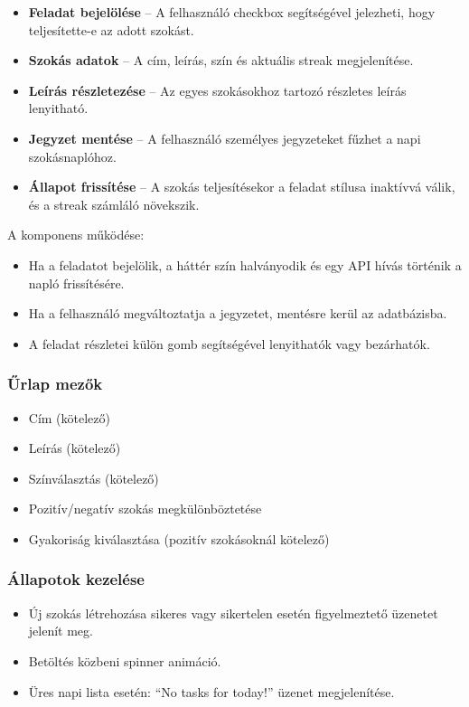 \documentclass[12pt]{report}
\begin{document}
\begin{itemize}
  \item \textbf{Feladat bejelölése} -- A felhasználó checkbox segítségével jelezheti, hogy teljesítette-e az adott szokást.
  \item \textbf{Szokás adatok} -- A cím, leírás, szín és aktuális streak megjelenítése.
  \item \textbf{Leírás részletezése} -- Az egyes szokásokhoz tartozó részletes leírás lenyitható.
  \item \textbf{Jegyzet mentése} -- A felhasználó személyes jegyzeteket fűzhet a napi szokásnaplóhoz.
  \item \textbf{Állapot frissítése} -- A szokás teljesítésekor a feladat stílusa inaktívvá válik, és a streak számláló növekszik.
\end{itemize}

A komponens működése:
\begin{itemize}
  \item Ha a feladatot bejelölik, a háttér szín halványodik és egy API hívás történik a napló frissítésére.
  \item Ha a felhasználó megváltoztatja a jegyzetet, mentésre kerül az adatbázisba.
  \item A feladat részletei külön gomb segítségével lenyithatók vagy bezárhatók.
\end{itemize}

\subsubsection{Űrlap mezők}

\begin{itemize}
  \item Cím (kötelező)
  \item Leírás (kötelező)
  \item Színválasztás (kötelező)
  \item Pozitív/negatív szokás megkülönböztetése
  \item Gyakoriság kiválasztása (pozitív szokásoknál kötelező)
\end{itemize}

\subsubsection{Állapotok kezelése}

\begin{itemize}
  \item Új szokás létrehozása sikeres vagy sikertelen esetén figyelmeztető üzenetet jelenít meg.
  \item Betöltés közbeni spinner animáció.
  \item Üres napi lista esetén: ``No tasks for today!'' üzenet megjelenítése.
\end{itemize}
\end{document}
